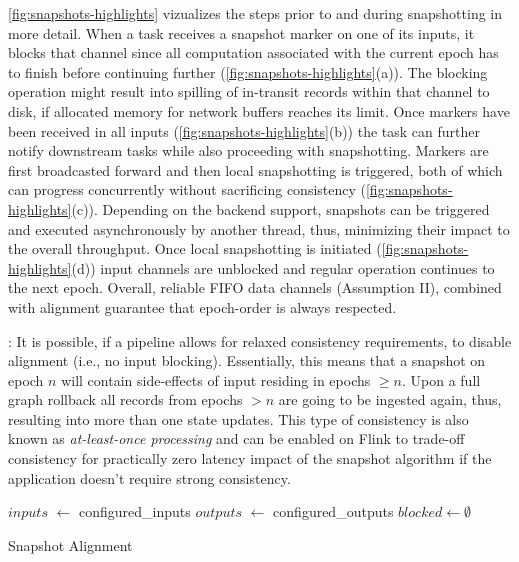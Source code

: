  \autoref{fig:snapshots-highlights} vizualizes the steps prior to and during snapshotting in more detail. When a task receives a snapshot marker on one of its inputs, it blocks that channel since all computation associated with the current epoch has to finish before continuing further (\autoref{fig:snapshots-highlights}(a)). The blocking operation might result into spilling of in-transit records within that channel to disk, if allocated memory for network buffers reaches its limit. Once markers have been received in all inputs (\autoref{fig:snapshots-highlights}(b)) the task can further notify downstream tasks while also proceeding with snapshotting. Markers are first broadcasted forward and then local snapshotting is triggered, both of which can progress concurrently without sacrificing consistency (\autoref{fig:snapshots-highlights}(c)). Depending on the backend support, snapshots can be triggered and executed asynchronously by another thread, thus, minimizing their impact to the overall throughput. Once local snapshotting is initiated (\autoref{fig:snapshots-highlights}(d)) input channels are unblocked and regular operation continues to the next epoch. Overall, reliable FIFO data channels (Assumption II), combined with alignment guarantee that epoch-order is always respected. 

: It is possible, if a pipeline allows for relaxed consistency requirements, to disable alignment (i.e., no input blocking). Essentially, this means that a snapshot on epoch $n$ will contain side-effects of input residing in epochs $\geq n$. Upon a full graph rollback all records from epochs $> n$ are going to be ingested again, thus, resulting into more than one state updates. This type of consistency is also known as \emph{at-least-once processing} and can be enabled on Flink to trade-off consistency for practically zero latency impact of the snapshot algorithm if the application doesn't require strong consistency.


\begin{algorithm}[h]
$inputs$ $\leftarrow$ configured\_inputs\;
$outputs$ $\leftarrow$ configured\_outputs\;
$blocked \leftarrow \emptyset$ \;

\caption{Snapshot Alignment}
\label{alg:snapdag}
\end{algorithm}

